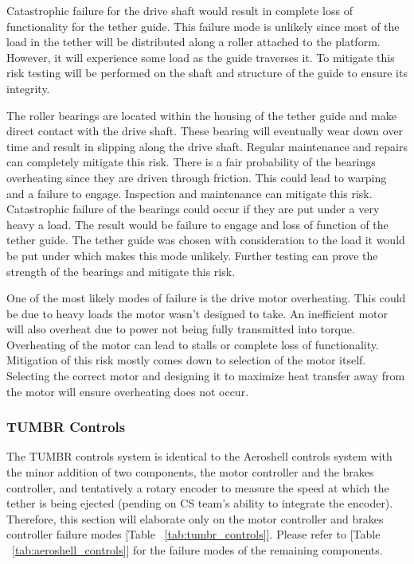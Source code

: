 Catastrophic failure for the drive shaft would result in complete loss of functionality for the tether guide. This failure mode is unlikely since most of the load in the tether will be distributed along a roller attached to the platform. However, it will experience some load as the guide traverses it. To mitigate this risk testing will be performed on the shaft and structure of the guide to ensure its integrity.

The roller bearings are located within the housing of the tether guide and make direct contact with the drive shaft. These bearing will eventually wear down over time and result in slipping along the drive shaft. Regular maintenance and repairs can completely mitigate this risk. There is a fair probability of the bearings overheating since they are driven through friction. This could lead to warping and a failure to engage. Inspection and maintenance can mitigate this risk. Catastrophic failure of the bearings could occur if they are put under a very heavy a load. The result would be failure to engage and loss of function of the tether guide. The tether guide was chosen with consideration to the load it would be put under which makes this mode unlikely. Further testing can prove the strength of the bearings and mitigate this risk.

One of the most likely modes of failure is the drive motor overheating. This could be due to heavy loads the motor wasn’t designed to take. An inefficient motor will also overheat due to power not being fully transmitted into torque. Overheating of the motor can lead to stalls or complete loss of functionality. Mitigation of this risk mostly comes down to selection of the motor itself. Selecting the correct motor and designing it to maximize heat transfer away from the motor will ensure overheating does not occur. 



\subsubsection{\label{sss:tumbr_controls} TUMBR Controls}

\indent\indent The TUMBR controls system is identical to the Aeroshell controls system with the minor addition of two components, the motor controller and the brakes controller, and tentatively a rotary encoder to measure the speed at which the tether is being ejected (pending on CS team's ability to integrate the encoder). Therefore, this section will elaborate only on the motor controller and brakes controller failure modes [Table ~\ref{tab:tumbr_controls}]. Please refer to [Table ~\ref{tab:aeroshell_controls}] for the failure modes of the remaining components.

